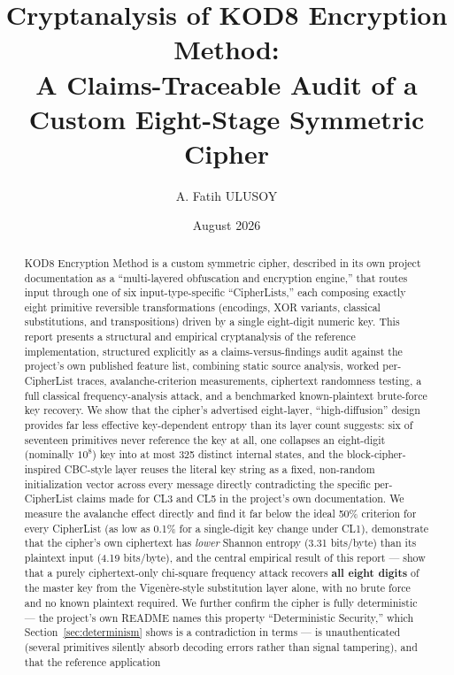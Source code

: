 \documentclass[11pt]{article}
\title{\textbf{Cryptanalysis of KOD8 Encryption Method:\\
A Claims-Traceable Audit of a Custom Eight-Stage Symmetric Cipher}}
\author{A. Fatih ULUSOY}
\date{August 2026}
\begin{document}
\maketitle

\begin{abstract}
\noindent
KOD8 Encryption Method is a custom symmetric cipher, described in
its own project documentation as a ``multi-layered obfuscation and
encryption engine,'' that routes input through one of six
input-type-specific ``CipherLists,'' each composing exactly eight
primitive reversible transformations (encodings, XOR variants, classical
substitutions, and transpositions) driven by a single eight-digit numeric
key. This report presents a structural and empirical cryptanalysis of
the reference implementation, structured explicitly as a
claims-versus-findings audit against the project's own published
feature list, combining static source analysis, worked
per-CipherList traces, avalanche-criterion measurements, ciphertext
randomness testing, a full classical frequency-analysis attack, and a
benchmarked known-plaintext brute-force key recovery. We show that the
cipher's advertised eight-layer, ``high-diffusion'' design provides far
less effective key-dependent entropy than its layer count suggests: six
of seventeen primitives never reference the key at all, one collapses
an eight-digit (nominally $10^{8}$) key into at most 325 distinct
internal states, and the block-cipher-inspired CBC-style layer reuses
the literal key string as a fixed, non-random initialization vector
across every message directly contradicting the specific
per-CipherList claims made for CL3 and CL5 in the project's own
documentation. We measure the avalanche effect directly and find it far
below the ideal 50\% criterion for every CipherList (as low as 0.1\% for a single-digit
key change under CL1), demonstrate that the cipher's own ciphertext has
\emph{lower} Shannon entropy (3.31 bits/byte) than its plaintext input
(4.19 bits/byte), and the central empirical result of this report ---
show that a purely ciphertext-only chi-square frequency attack recovers
\textbf{all eight digits} of the master key from the Vigen\`ere-style
substitution layer alone, with no brute force and no known plaintext
required. We further confirm the cipher is fully deterministic --- the
project's own README names this property ``Deterministic Security,''
which Section~\ref{sec:determinism} shows is a contradiction in terms ---
is unauthenticated (several primitives silently absorb decoding
errors rather than signal tampering), and that the reference application

\end{abstract}
\end{document}
